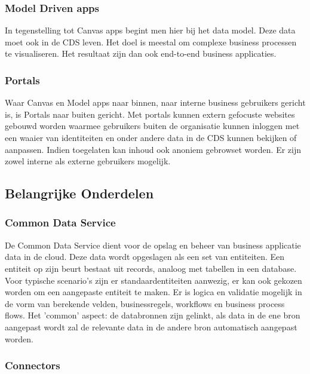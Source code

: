 \subsubsection{Model Driven apps}

In tegenstelling tot Canvas apps begint men hier bij het data model. Deze data moet ook in de CDS leven. Het doel is meestal om complexe business processen te visualiseren. Het resultaat zijn dan ook end-to-end business applicaties. \autocite{PragmaticWorks2019}

\subsubsection{Portals}

Waar Canvas en Model apps naar binnen, naar interne business gebruikers gericht is, is Portals naar buiten gericht. Met portals kunnen extern gefocuste websites gebouwd worden waarmee gebruikers buiten de organisatie kunnen inloggen met een waaier van identiteiten en onder andere data in de CDS kunnen bekijken of aanpassen. Indien toegelaten kan inhoud ook anoniem gebrowset worden. Er zijn zowel interne als externe gebruikers mogelijk. \autocite{MicrosoftDocs2020a}

\subsection{Belangrijke Onderdelen}

\subsubsection{Common Data Service}

De Common Data Service dient voor de opslag en beheer van business applicatie data in de cloud. Deze data wordt opgeslagen als een set van entiteiten. Een entiteit op zijn beurt bestaat uit records, analoog met tabellen in een database. Voor typische scenario's zijn er standaardentiteiten aanwezig, er kan ook gekozen worden om een aangepaste entiteit te maken. Er is logica en validatie mogelijk in de vorm van berekende velden, businessregels, workflows en business process flows. Het 'common' aspect: de databronnen zijn gelinkt, als data in de ene bron aangepast wordt zal de relevante data in de andere bron automatisch aangepast worden. \autocite{MicrosoftDocs2019a}

\subsubsection{Connectors}

